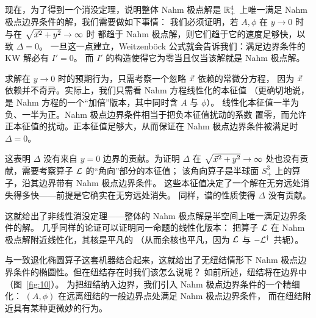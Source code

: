 现在，为了得到一个消没定理，说明整体 Nahm 极点解是 $\mathbb{R}^4_+$ 上唯一满足
Nahm 极点边界条件的解，我们需要做如下事情：
我们必须证明，若 $A,\phi$ 在 $y\to 0$ 时与在 $\sqrt{\vec{x}^{2}+y^{2}}\to\infty$ 时
都趋于 Nahm 极点解，则它们趋于它的速度足够快，以致 $\Delta=0$。
一旦这一点建立，Weitzenböck 公式就会告诉我们：满足边界条件的 KW 解必有 $I'=0$。
而 $I'$ 的构造使得它为零当且仅当该解就是 Nahm 极点解。

求解在 $y\to 0$ 时的预期行为，只需考察一个忽略 $\vec{x}$ 依赖的常微分方程，
因为 $\vec{x}$ 依赖并不奇异。实际上，我们只需看 Nahm 方程线性化的本征值
（更确切地说，是 Nahm 方程的一个“加倍”版本，其中同时含 $A$ 与 $\phi$）。
线性化本征值一半为负、一半为正。Nahm 极点边界条件相当于把负本征值扰动的系数
置零，而允许正本征值的扰动。正本征值足够大，从而保证在 Nahm 极点边界条件被满足时 $\Delta=0$。


这表明 $\Delta$ 没有来自 $y=0$ 边界的贡献。为证明 $\Delta$ 在
$\sqrt{\vec{x}^{2}+y^{2}}\to\infty$ 处也没有贡献，需要考察算子 $\mathcal{L}$ 的“角向”部分的本征值；
该角向算子是半球面 $S^3_+$ 上的算子，沿其边界带有 Nahm 极点边界条件。
这些本征值决定了一个解在无穷远处消失得多快——前提是它确实在无穷远处消失。
同样，谱的性质使得 $\Delta$ 没有贡献。


这就给出了非线性消没定理——整体的 Nahm 极点解是半空间上唯一满足边界条件的解。
几乎同样的论证可以证明同一命题的线性化版本：
把算子 $\mathcal{L}$ 在 Nahm 极点解附近线性化，其核是平凡的
（从而余核也平凡，因为 $\mathcal{L}$ 与 $-\mathcal{L}^{\dagger}$ 共轭）。


与一致退化椭圆算子这套机器结合起来，这就给出了无纽结情形下
Nahm 极点边界条件的椭圆性。但在纽结存在时我们该怎么说呢？
如前所述，纽结将在边界中（图~\ref{fig:10}）。
为把纽结纳入边界，我们引入 Nahm 极点边界条件的一个精细化：
$(A,\phi)$ 在远离纽结的一般边界点处满足 Nahm 极点边界条件，
而在纽结附近具有某种更微妙的行为。

